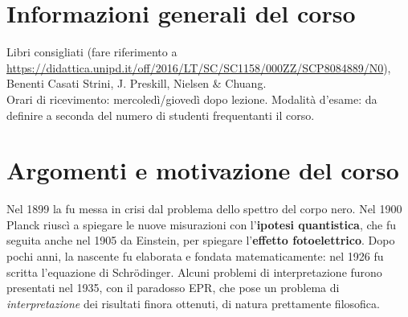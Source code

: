 \documentclass[../../InformazioneQuantistica.tex]{subfiles}
\begin{document}
\section{Informazioni generali del corso}
Libri consigliati (fare riferimento a \url{https://didattica.unipd.it/off/2016/LT/SC/SC1158/000ZZ/SCP8084889/N0}), Benenti Casati Strini, J. Preskill, Nielsen \& Chuang.\\
Orari di ricevimento: mercoledì/giovedì dopo lezione. Modalità d'esame: da definire a seconda del numero di studenti frequentanti il corso.

\section{Argomenti e motivazione del corso}
Nel 1899 la \MC fu messa in crisi dal problema dello spettro del corpo nero. Nel 1900 Planck riuscì a spiegare le nuove misurazioni con l'\textbf{ipotesi quantistica}, che fu seguita anche nel 1905 da Einstein, per spiegare l'\textbf{effetto fotoelettrico}. Dopo pochi anni, la nascente \MQ fu elaborata e fondata matematicamente: nel 1926 fu scritta l'equazione di Schr\"odinger. Alcuni problemi di interpretazione furono presentati nel 1935, con il paradosso EPR, che pose un problema di \textit{interpretazione} dei risultati finora ottenuti, di natura prettamente filosofica. \\
\end{document}
